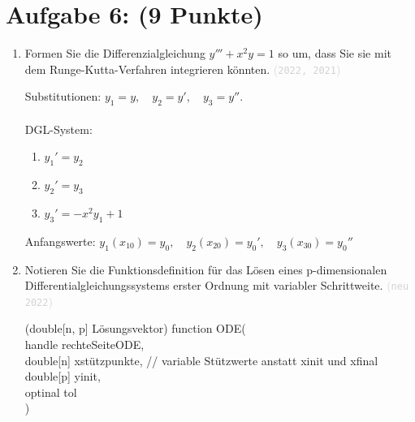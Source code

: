 \documentclass[12pt]{article}
\newcommand{\kommentarMacro}[1]{\textcolor{lightgray}{(\texttt{#1})}}
\begin{document}
\pagebreak

\section*{Aufgabe 6: (9 Punkte)}
\begin{enumerate}
    \item Formen Sie die Differenzialgleichung $y''' + x^2y = 1$ so um, dass Sie sie mit dem Runge-Kutta-Verfahren integrieren könnten. \kommentarMacro{2022, 2021}

          \begin{solution}
              Substitutionen: $y_1 = y,\quad y_2 = y',\quad y_3 = y''$.\\\\
              DGL-System:
              \begin{enumerate}
                  \item $y_1' = y_2$
                  \item $y_2' = y_3$
                  \item $y_3' = -x^2y_1 + 1$
              \end{enumerate}

              Anfangswerte: $y_1(x_{10}) = y_0,\quad y_2(x_{20}) = y_0', \quad y_3(x_{30}) = y_0''$
          \end{solution}

    \item Notieren Sie die Funktionsdefinition für das Lösen eines p-dimensionalen Differentialgleichungssystems erster Ordnung mit variabler Schrittweite. \kommentarMacro{neu 2022}

          \begin{solution}
              (double[n, p] Lösungsvektor) function ODE( \\
              \indentTab handle rechteSeiteODE, \\
              \indentTab double[n] xstützpunkte, // variable Stützwerte anstatt xinit und xfinal \\
              \indentTab double[p] yinit, \\
              \indentTab optinal tol \\
              )
          \end{solution}


\end{enumerate}
\end{document}
